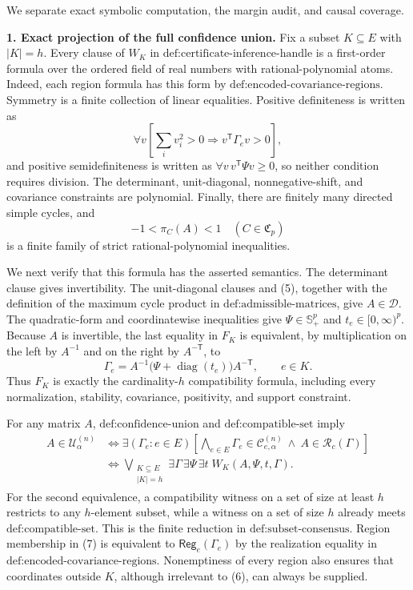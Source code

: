 We separate exact symbolic computation, the margin audit, and causal coverage.

\textbf{1. Exact projection of the full confidence union.}
Fix a subset \(K\subseteq E\) with \(|K|=h\).  Every clause of \(W_K\) in \(\text{def:certificate-inference-handle}\) is a first-order formula over the ordered field of real numbers with rational-polynomial atoms.  Indeed, each region formula has this form by \(\text{def:encoded-covariance-regions}\).  Symmetry is a finite collection of linear equalities.  Positive definiteness is written as
\[
 \forall v\left[
 \sum_i v_i^2>0\Rightarrow v^{\mathsf T}\Gamma_ev>0
 \right],
\]
and positive semidefiniteness is written as \(\forall v\,v^{\mathsf T}\Psi v\geq0\), so neither condition requires division.  The determinant, unit-diagonal, nonnegative-shift, and covariance constraints are polynomial.  Finally, there are finitely many directed simple cycles, and
\[
 -1<\pi_C(A)<1\quad(C\in\mathfrak C_p)
\tag{5}
\]
is a finite family of strict rational-polynomial inequalities.

We next verify that this formula has the asserted semantics.  The determinant clause gives invertibility.  The unit-diagonal clauses and (5), together with the definition of the maximum cycle product in \(\text{def:admissible-matrices}\), give \(A\in\mathcal D\).  The quadratic-form and coordinatewise inequalities give \(\Psi\in\mathbb S_+^p\) and \(t_e\in[0,\infty)^p\).  Because \(A\) is invertible, the last equality in \(F_K\) is equivalent, by multiplication on the left by \(A^{-1}\) and on the right by \(A^{-\mathsf T}\), to
\[
 \Gamma_e=A^{-1}
  \bigl(\Psi+\operatorname{diag}(t_e)\bigr)A^{-\mathsf T},
 \qquad e\in K.
\tag{6}
\]
Thus \(F_K\) is exactly the cardinality-\(h\) compatibility formula, including every normalization, stability, covariance, positivity, and support constraint.

For any matrix \(A\), \(\text{def:confidence-union}\) and \(\text{def:compatible-set}\) imply
\[
\begin{aligned}
 A\in\mathcal U^{(n)}_\alpha
 &\Longleftrightarrow
 \exists(\Gamma_e:e\in E)\left[
   \bigwedge_{e\in E}\Gamma_e\in\mathcal C^{(n)}_{e,\alpha}
   \ \wedge\ A\in\mathcal R_c(\Gamma)
 \right]\\
 &\Longleftrightarrow
 \bigvee_{\substack{K\subseteq E\\|K|=h}}
 \exists\Gamma\,\exists\Psi\,\exists t\;
 W_K(A,\Psi,t,\Gamma).
\end{aligned}
\tag{7}
\]
For the second equivalence, a compatibility witness on a set of size at least \(h\) restricts to any \(h\)-element subset, while a witness on a set of size \(h\) already meets \(\text{def:compatible-set}\).  This is the finite reduction in \(\text{def:subset-consensus}\).  Region membership in (7) is equivalent to \(\mathsf{Reg}_e(\Gamma_e)\) by the realization equality in \(\text{def:encoded-covariance-regions}\).  Nonemptiness of every region also ensures that coordinates outside \(K\), although irrelevant to (6), can always be supplied.

